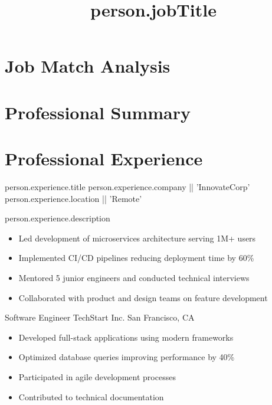 \documentclass[11pt,a4paper,sans]{moderncv}
\title{{{person.jobTitle}}}
\begin{document}
\makecvtitle

\section{Job Match Analysis}

\section{Professional Summary}

\section{Professional Experience}
    {{{person.experience.title}}}
    {{{person.experience.company || 'InnovateCorp'}}}
    {{{person.experience.location || 'Remote'}}}
    {}
    {{{person.experience.description}}
    \begin{itemize}
        \item Led development of microservices architecture serving 1M+ users
        \item Implemented CI/CD pipelines reducing deployment time by 60\%
        \item Mentored 5 junior engineers and conducted technical interviews
        \item Collaborated with product and design teams on feature development
    \end{itemize}}

    {Software Engineer}
    {TechStart Inc.}
    {San Francisco, CA}
    {}
    {\begin{itemize}
        \item Developed full-stack applications using modern frameworks
        \item Optimized database queries improving performance by 40\%
        \item Participated in agile development processes
        \item Contributed to technical documentation
    \end{itemize}}
\end{document}
